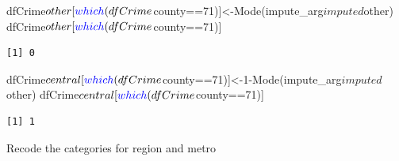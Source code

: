 \documentclass[]{article}
\newenvironment{Shaded}{}{}
\newcommand{\DecValTok}[1]{#1}
\newcommand{\KeywordTok}[1]{\textcolor[rgb]{0.00,0.00,1.00}{#1}}
\newcommand{\NormalTok}[1]{#1}
\newcommand{\OperatorTok}[1]{#1}
\begin{document}
\begin{Shaded}
\begin{Highlighting}[]
\NormalTok{dfCrime}\OperatorTok{$}\NormalTok{other[}\KeywordTok{which}\NormalTok{(dfCrime}\OperatorTok{$}\NormalTok{county}\OperatorTok{==}\DecValTok{71}\NormalTok{)]<-}\KeywordTok{Mode}\NormalTok{(impute_arg}\OperatorTok{$}\NormalTok{imputed}\OperatorTok{$}\NormalTok{other)}
\NormalTok{dfCrime}\OperatorTok{$}\NormalTok{other[}\KeywordTok{which}\NormalTok{(dfCrime}\OperatorTok{$}\NormalTok{county}\OperatorTok{==}\DecValTok{71}\NormalTok{)]}
\end{Highlighting}
\end{Shaded}

\begin{verbatim}
[1] 0
\end{verbatim}

\begin{Shaded}
\begin{Highlighting}[]
\NormalTok{dfCrime}\OperatorTok{$}\NormalTok{central[}\KeywordTok{which}\NormalTok{(dfCrime}\OperatorTok{$}\NormalTok{county}\OperatorTok{==}\DecValTok{71}\NormalTok{)]<-}\DecValTok{1}\OperatorTok{-}\KeywordTok{Mode}\NormalTok{(impute_arg}\OperatorTok{$}\NormalTok{imputed}\OperatorTok{$}\NormalTok{other)}
\NormalTok{dfCrime}\OperatorTok{$}\NormalTok{central[}\KeywordTok{which}\NormalTok{(dfCrime}\OperatorTok{$}\NormalTok{county}\OperatorTok{==}\DecValTok{71}\NormalTok{)]}
\end{Highlighting}
\end{Shaded}

\begin{verbatim}
[1] 1
\end{verbatim}

Recode the categories for region and metro
\end{document}
